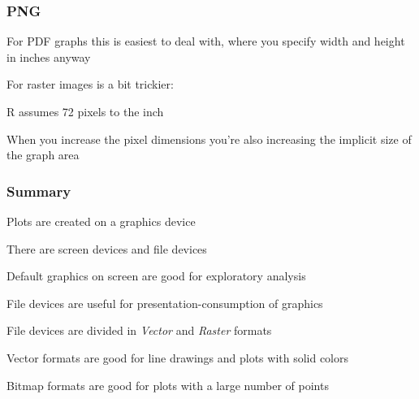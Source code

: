 \documentclass[12pt]{beamer}\usepackage[]{graphicx}\usepackage[]{color}
\begin{document}

\begin{frame}
\frametitle{PNG}

\bi
  \item For PDF graphs this is easiest to deal with, where you specify width and height in inches anyway
  \item For raster images is a bit trickier:
  \item R assumes 72 pixels to the inch
  \item When you increase the pixel dimensions you're also increasing the implicit size of the graph area
\ei
\eb

\end{frame}


\begin{frame}
\frametitle{Summary}

\bi
  \item Plots are created on a graphics device
  \item There are screen devices and file devices
  \item Default graphics on screen are good for exploratory analysis
  \item File devices are useful for presentation-consumption of graphics
  \item File devices are divided in \textit{Vector} and \textit{Raster} formats
  \item Vector formats are good for line drawings and plots with solid colors
  \item Bitmap formats are good for plots with a large number of points
\ei

\end{frame}


\begin{frame}
\begin{center}
\Huge{}
\end{center}
\end{frame}

\end{document}
